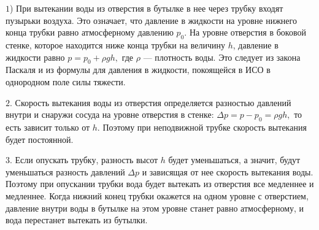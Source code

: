 \documentclass[12pt,a4paper]{article}
\begin{document}
{\par\smallskip\noindent $1$) При вытекании воды из отверстия в бутылке в нее через трубку входят пузырьки воздуха. Это означает, что давление в жидкости на уровне нижнего конца трубки равно атмосферному давлению $p_{0}.$ На уровне отверстия в боковой стенке, которое находится ниже конца трубки на величину $h$, давление в жидкости равно $p = p_{0} + \rho gh,$ где $\rho$ — плотность воды. Это следует из закона Паскаля и из формулы для давления в жидкости, покоящейся в ИСО в однородном поле силы тяжести.
\par\smallskip\noindent $2$. Скорость вытекания воды из отверстия определяется разностью давлений внутри и снаружи сосуда на уровне отверстия в стенке: $\Delta p = p - p_{0} = \rho gh,$ то есть зависит только от $h$. Поэтому при неподвижной трубке скорость вытекания будет постоянной.
\par\smallskip\noindent $3$. Если опускать трубку, разность высот $h$ будет уменьшаться, а значит, будут уменьшаться разность давлений $\Delta p$ и зависящая от нее скорость вытекания воды. Поэтому при опускании трубки вода будет вытекать из отверстия все медленнее и медленнее. Когда нижний конец трубки окажется на одном уровне с отверстием, давление внутри воды в бутылке на этом уровне станет равно атмосферному, и вода перестанет вытекать из бутылки.
}
\end{document}

